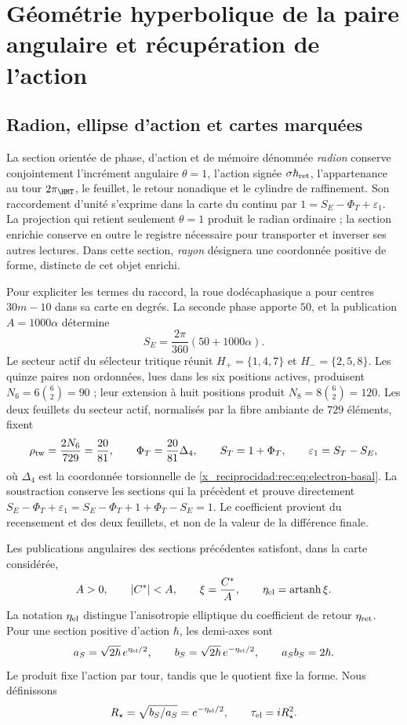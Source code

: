 \chapter{Géométrie hyperbolique de la paire angulaire et récupération de l'action}
\label{x_reciprocidad:rec:radial}

\section{Radion, ellipse d’action et cartes marquées}

La section orientée de phase, d’action et de mémoire dénommée \emph{radion} conserve conjointement l’incrément angulaire \(\theta=1\), l’action signée \(\sigma\hbar_{\rm ret}\), l’appartenance au tour \(2\pi_{\HMT}\), le feuillet, le retour nonadique et le cylindre de raffinement. Son raccordement d’unité s’exprime dans la carte du continu par \(1=S_E-\Phi_T+\varepsilon_1\). La projection qui retient seulement \(\theta=1\) produit le radian ordinaire ; la section enrichie conserve en outre le registre nécessaire pour transporter et inverser ses autres lectures. Dans cette section, \emph{rayon} désignera une coordonnée positive de forme, distincte de cet objet enrichi.


Pour expliciter les termes du raccord, la roue dodécaphasique a pour centres \(30m-10\) dans sa carte en degrés. La seconde phase apporte \(50\), et la publication \(A=1000\alpha\) détermine
\[
 S_E=\frac{2\pi}{360}(50+1000\alpha).
\]
Le secteur actif du sélecteur tritique réunit \(H_+=\{1,4,7\}\) et \(H_-=\{2,5,8\}\). Les quinze paires non ordonnées, lues dans les six positions actives, produisent \(N_6=6\binom62=90\) ; leur extension à huit positions produit \(N_8=8\binom62=120\). Les deux feuillets du secteur actif, normalisés par la fibre ambiante de \(729\) éléments, fixent
\[
 \rho_{\rm tw}=\frac{2N_6}{729}=\frac{20}{81},\qquad
 \Phi_T=\frac{20}{81}\Delta_4,\qquad
 S_T=1+\Phi_T,\qquad \varepsilon_1=S_T-S_E,
\]
où \(\Delta_4\) est la coordonnée torsionnelle de \eqref{x_reciprocidad:rec:eq:electron-basal}. La soustraction conserve les sections qui la précèdent et prouve directement
\(S_E-\Phi_T+\varepsilon_1=S_E-\Phi_T+1+\Phi_T-S_E=1\).
Le coefficient provient du recensement et des deux feuillets, et non de la valeur de la différence finale.

Les publications angulaires des sections précédentes satisfont, dans la carte considérée,
\[
 A>0,\qquad |C^*|<A,\qquad
 \xi=\frac{C^*}{A},\qquad \eta_{\rm el}=\operatorname{artanh}\xi.
\]
La notation \(\eta_{\rm el}\) distingue l'anisotropie elliptique du coefficient de retour \(\eta_{\rm ret}\). Pour une section positive d'action \(\hbar\), les demi-axes sont
\begin{equation}
 a_S=\sqrt{2\hbar}\,e^{\eta_{\rm el}/2},\qquad
 b_S=\sqrt{2\hbar}\,e^{-\eta_{\rm el}/2},\qquad a_Sb_S=2\hbar.
 \label{x_reciprocidad:rec:eq:elipse}
\end{equation}
Le produit fixe l’action par tour, tandis que le quotient fixe la forme. Nous définissons
\[
 R_\star=\sqrt{b_S/a_S}=e^{-\eta_{\rm el}/2},\qquad
 \tau_{\rm el}=iR_\star^2.
\]


